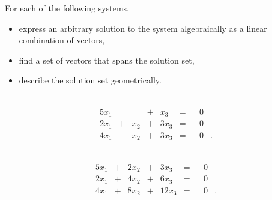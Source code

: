 \begin{example} For each of the following systems, 
	\begin{itemize}
	\item express an arbitrary solution to the system algebraically as a linear combination of vectors,
	\item find a set of vectors that spans the solution set,
	\item describe the solution set geometrically.
	\end{itemize}
\ba
\item ~
\begin{alignat*}{5}
{}x_1 	&{}{} 		&{} 		&{}+{}		&{}x_3 		&= &{} 	&0&{} \\
{2}x_1 	&{}+{}	&{}x_2 	&{}+{} 		&{3}x_3 		&= &{} 	&0&{} \\
{4}x_1	&{}-{} 	&{}x_2 	&{}+{} 		&{3}x_3		&= &{} 	&0&{.} 
\end{alignat*}
\item ~
\begin{alignat*}{5}
{}x_1 	&{}+{} 	&{2}x_2 	&{}+{}		&{3}x_3 		&= &{} 	&0&{} \\
{2}x_1 	&{}+{}	&{4}x_2 	&{}+{} 		&{6}x_3 		&= &{} 	&0&{} \\
{4}x_1	&{}+{} 	&{8}x_2 	&{}+{} 		&{12}x_3		&= &{} 	&0&{.} 
\end{alignat*}
\ea


\end{example}
